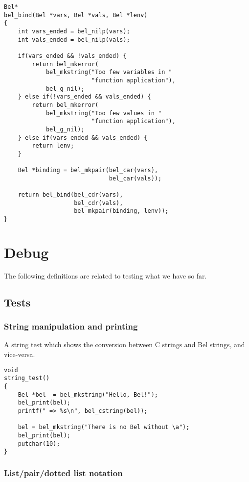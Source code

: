 \documentclass[openright,a4paper,twoside,12pt]{memoir}
\begin{document}
\begin{verbatim}
Bel*
bel_bind(Bel *vars, Bel *vals, Bel *lenv)
{
    int vars_ended = bel_nilp(vars);
    int vals_ended = bel_nilp(vals);

    if(vars_ended && !vals_ended) {
        return bel_mkerror(
            bel_mkstring("Too few variables in "
                         "function application"),
            bel_g_nil);
    } else if(!vars_ended && vals_ended) {
        return bel_mkerror(
            bel_mkstring("Too few values in "
                         "function application"),
            bel_g_nil);
    } else if(vars_ended && vals_ended) {
        return lenv;
    }

    Bel *binding = bel_mkpair(bel_car(vars),
                              bel_car(vals));

    return bel_bind(bel_cdr(vars),
                    bel_cdr(vals),
                    bel_mkpair(binding, lenv));
}
\end{verbatim}

\chapter{Debug}
\label{sec:org4b1be94}

The following definitions are related to testing what we have so
far.

\section{Tests}
\label{sec:org4ceb870}
\subsection{String manipulation and printing}
\label{sec:orgfff120a}

A string test which shows the conversion between C strings and Bel
strings, and vice-versa.

\begin{verbatim}
void
string_test()
{
    Bel *bel  = bel_mkstring("Hello, Bel!");
    bel_print(bel);
    printf(" => %s\n", bel_cstring(bel));

    bel = bel_mkstring("There is no Bel without \a");
    bel_print(bel);
    putchar(10);
}
\end{verbatim}

\subsection{List/pair/dotted list notation}
\label{sec:orgae3aad8}
\end{document}
